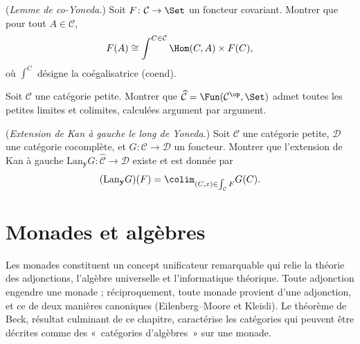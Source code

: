 \begin{exercice}\label{exo:coyoneda}
(\emph{Lemme de co-Yoneda.})
Soit $F \colon \mathcal{C} \to \Set$ un foncteur covariant.
Montrer que pour tout $A \in \mathcal{C}$,
\[
    F(A) \cong \int^{C \in \mathcal{C}} \Hom(C, A) \times F(C),
\]
où $\int^C$ désigne la coégalisatrice (coend).
\end{exercice}

\begin{exercice}\label{exo:presheaf-complete}
Soit $\mathcal{C}$ une catégorie petite. Montrer que
$\widehat{\mathcal{C}} = \Fun(\mathcal{C}^{\op}, \Set)$
admet toutes les petites limites et colimites, calculées
argument par argument.
\end{exercice}

\begin{exercice}\label{exo:yoneda-extension}
(\emph{Extension de Kan à gauche le long de Yoneda.})
Soit $\mathcal{C}$ une catégorie petite, $\mathcal{D}$ une catégorie
cocomplète, et $G \colon \mathcal{C} \to \mathcal{D}$ un foncteur.
Montrer que l'extension de Kan à gauche $\mathrm{Lan}_{\mathbf{y}} G
\colon \widehat{\mathcal{C}} \to \mathcal{D}$ existe et est donnée par
\[
    (\mathrm{Lan}_{\mathbf{y}} G)(F)
    = \colim_{(C, x) \in \int_{\mathcal{C}} F} G(C).
\]
\end{exercice}




\chapter{Monades et algèbres}\label{ch:monades}
\minitoc

\vspace{1em}

Les monades constituent un concept unificateur remarquable
qui relie la théorie des adjonctions, l'algèbre universelle et
l'informatique théorique.
Toute adjonction engendre une monade ; réciproquement, toute monade
provient d'une adjonction, et ce de deux manières canoniques
(Eilenberg--Moore et Kleisli).
Le théorème de Beck, résultat culminant de ce chapitre, caractérise
les catégories qui peuvent être décrites comme des «~catégories d'algèbres~»
sur une monade.

